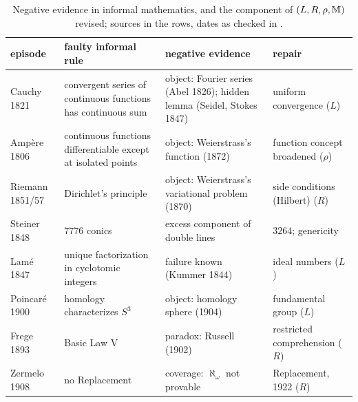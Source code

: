 \begin{table}[t]
\centering\small
\begin{tabularx}{\textwidth}{@{}l>{\raggedright\arraybackslash}X>{\raggedright\arraybackslash}X>{\raggedright\arraybackslash}X@{}}
\toprule
episode & faulty informal rule & negative evidence & repair \\
\midrule
Cauchy 1821 & convergent series of continuous functions has continuous sum & object: Fourier series (Abel 1826); hidden lemma (Seidel, Stokes 1847) \citep[App.~1]{lakatos1976proofs} & uniform convergence ($L$) \\
Ampère 1806 & continuous functions differentiable except at isolated points & object: Weierstrass's function (1872) & function concept broadened ($\rho$) \\
Riemann 1851/57 & Dirichlet's principle & object: Weierstrass's variational problem (1870) \citep{monna1975dirichlet} & side conditions (Hilbert) ($R$) \\
Steiner 1848 & $7776$ conics & excess component of double lines \citep{eisenbud20163264} & $3264$; genericity \\
Lamé 1847 & unique factorization in cyclotomic integers & failure known (Kummer 1844) \citep{edwards1977fermat} & ideal numbers ($L$) \\
Poincaré 1900 & homology characterizes $S^3$ & object: homology sphere (1904) & fundamental group ($L$) \\
Frege 1893 & Basic Law V & paradox: Russell (1902) \citep{vanheijenoort1967from} & restricted comprehension ($R$) \\
Zermelo 1908 & no Replacement & coverage: $\aleph_\omega$ not provable \citep{vanheijenoort1967from} & Replacement, 1922 ($R$) \\
\bottomrule
\end{tabularx}
\caption{Negative evidence in informal mathematics, and the component of $(L,R,\rho,\mathbb M)$ revised; sources in the rows, dates as checked in .}
\label{tab:informal:history}
\end{table}

